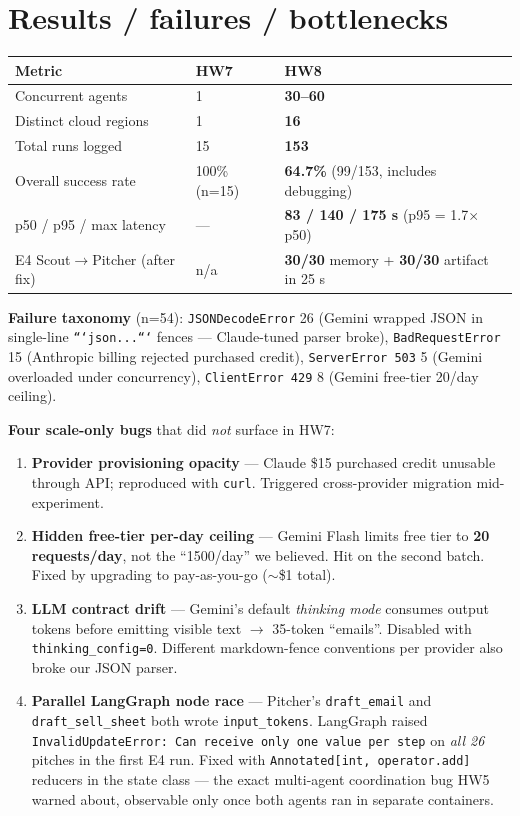 \documentclass[9pt]{extarticle}
\begin{document}
\section*{Results / failures / bottlenecks}

\begin{center}
\small
\begin{tabular}{lll}
\toprule
\textbf{Metric} & \textbf{HW7} & \textbf{HW8} \\
\midrule
Concurrent agents          & 1            & \textbf{30--60} \\
Distinct cloud regions     & 1            & \textbf{16} \\
Total runs logged          & 15           & \textbf{153} \\
Overall success rate       & 100\% (n=15) & \textbf{64.7\%} (99/153, includes debugging) \\
p50 / p95 / max latency    & ---          & \textbf{83 / 140 / 175 s} (p95 = 1.7$\times$ p50) \\
E4 Scout$\to$Pitcher (after fix) & n/a   & \textbf{30/30} memory + \textbf{30/30} artifact in 25 s \\
\bottomrule
\end{tabular}
\end{center}

\textbf{Failure taxonomy} (n=54):
\texttt{JSONDecodeError} 26 (Gemini wrapped JSON in single-line \texttt{```json...```} fences --- Claude-tuned parser broke),
\texttt{BadRequestError} 15 (Anthropic billing rejected purchased credit),
\texttt{ServerError 503} 5 (Gemini overloaded under concurrency),
\texttt{ClientError 429} 8 (Gemini free-tier 20/day ceiling).

\textbf{Four scale-only bugs} that did \emph{not} surface in HW7:
\begin{enumerate}
  \item \textbf{Provider provisioning opacity} --- Claude \$15 purchased credit unusable through API; reproduced with \texttt{curl}. Triggered cross-provider migration mid-experiment.
  \item \textbf{Hidden free-tier per-day ceiling} --- Gemini Flash limits free tier to \textbf{20 requests/day}, not the ``1500/day'' we believed. Hit on the second batch. Fixed by upgrading to pay-as-you-go ($\sim$\$1 total).
  \item \textbf{LLM contract drift} --- Gemini's default \emph{thinking mode} consumes output tokens before emitting visible text $\to$ 35-token ``emails''. Disabled with \texttt{thinking\_config=0}. Different markdown-fence conventions per provider also broke our JSON parser.
  \item \textbf{Parallel LangGraph node race} --- Pitcher's \texttt{draft\_email} and \texttt{draft\_sell\_sheet} both wrote \texttt{input\_tokens}. LangGraph raised \texttt{InvalidUpdateError: Can receive only one value per step} on \emph{all 26} pitches in the first E4 run. Fixed with \texttt{Annotated[int, operator.add]} reducers in the state class --- the exact multi-agent coordination bug HW5 warned about, observable only once both agents ran in separate containers.
\end{enumerate}
\end{document}
